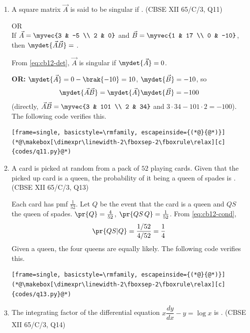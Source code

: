 \begin{enumerate}[label=\thesubsection.\arabic*, ref=\thesubsection.\theenumi,itemsep=0pt]
\item A square matrix $\vec{A}$ is said to be singular if \underline{\hspace{1.5cm}}.
\hfill (CBSE XII 65/C/3, Q11)

\hfill OR \\
If $\vec{A} = \myvec{3 & -5 \\ 2 & 0}$ and $\vec{B} = \myvec{1 & 17 \\ 0 & -10}$, then $\mydet{\vec{A}\vec{B}} = $ \underline{\hspace{1.5cm}}.

\solution From \eqref{eq:cb12-det}, $\vec{A}$ is singular if $\mydet{\vec{A}} = 0$. 

\textbf{OR:} $\mydet{\vec{A}} = 0 - \brak{-10} = 10$, $\mydet{\vec{B}} = -10$, so
\begin{align}
\mydet{\vec{A}\vec{B}} = \mydet{\vec{A}}\mydet{\vec{B}} = -100
\end{align}
(directly, $\vec{A}\vec{B} = \myvec{3 & 101 \\ 2 & 34}$ and $3\cdot 34 - 101\cdot 2 = -100$). The following code verifies this.
\begin{lstlisting}[frame=single, basicstyle=\rmfamily, escapeinside={(*@}{@*)}]
(*@\makebox[\dimexpr\linewidth-2\fboxsep-2\fboxrule\relax][c]{codes/q11.py}@*)
\end{lstlisting}

\item A card is picked at random from a pack of $52$ playing cards. Given that the picked up card is a queen, the probability of it being a queen of spades is \underline{\hspace{1.5cm}}.
\hfill (CBSE XII 65/C/3, Q13)

\solution Each card has pmf $\frac{1}{52}$. Let $Q$ be the event that the card is a queen and $QS$ the queen of spades. $\pr{Q} = \frac{4}{52}$, $\pr{QS\,Q} = \frac{1}{52}$. From \eqref{eq:cb12-cond},
\begin{align}
\pr{QS|Q} = \frac{1/52}{4/52} = \frac{1}{4}
\end{align}
Given a queen, the four queens are equally likely. The following code verifies this.
\begin{lstlisting}[frame=single, basicstyle=\rmfamily, escapeinside={(*@}{@*)}]
(*@\makebox[\dimexpr\linewidth-2\fboxsep-2\fboxrule\relax][c]{codes/q13.py}@*)
\end{lstlisting}

\item The integrating factor of the differential equation $x\dfrac{dy}{dx} - y = \log x$ is \underline{\hspace{1.5cm}}.
\hfill (CBSE XII 65/C/3, Q14)


\end{enumerate}
